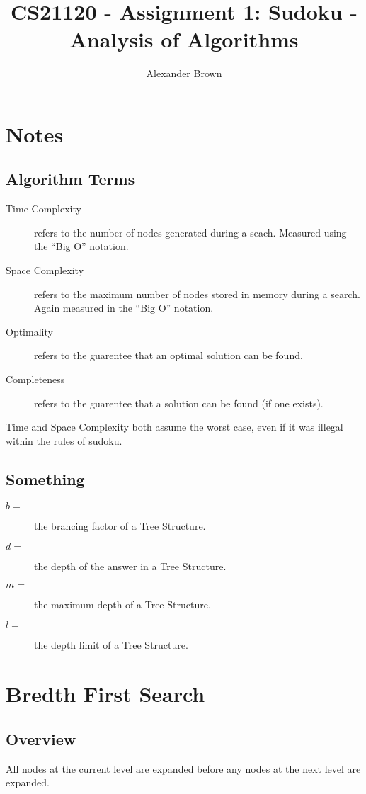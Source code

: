 \documentclass[10pt,letterpaper]{article}
\title{CS21120 - Assignment 1: Sudoku - Analysis of Algorithms}
\author{Alexander Brown}
\begin{document}
  \maketitle
  \section{Notes}
    \subsection{Algorithm Terms}
      \begin{description}
	\item[Time Complexity] refers to the number of nodes generated during a seach. Measured using the ``Big O'' notation. 
	\item[Space Complexity] refers to the maximum number of nodes stored in memory during a search. Again measured in the ``Big O'' notation.
	\item[Optimality] refers to the guarentee that an optimal solution can be found.
	\item[Completeness] refers to the guarentee that a solution can be found (if one exists).
      \end{description}
      
      Time and Space Complexity both assume the worst case, even if it was illegal within the rules of sudoku.
    
    \subsection{Something}
      \begin{description}
	\item[\(b =\)] the brancing factor of a Tree Structure.
	\item[\(d =\)] the depth of the answer in a Tree Structure.
	\item[\(m =\)] the maximum depth of a Tree Structure.
	\item[\(l =\)] the depth limit of a Tree Structure.
      \end{description}
    
  \newpage
  \section{Bredth First Search}
    \subsection{Overview}
      All nodes at the current level are expanded before any nodes at the next level are expanded.
\end{document}
